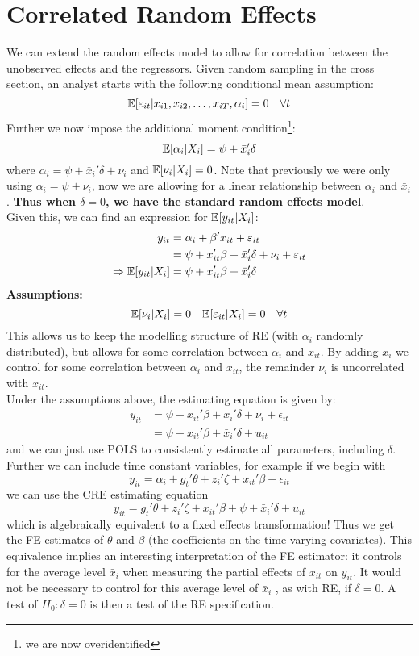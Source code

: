 \documentclass[DIV=14,titlepage=false]{scrreprt}
\begin{document}
\section{Correlated Random Effects}
We can extend the random effects model to allow for correlation between the unobserved effects and the regressors. Given random sampling in the cross section, an analyst starts with the following conditional mean assumption:
\[
    \mathbb{E}[\varepsilon_{it}|x_{i1}, x_{i2}, \dots, x_{iT}, \alpha_i] = 0 \quad \forall t
\]
Further we now impose the additional moment condition\footnote{we are now overidentified}:
\[
    \mathbb{E}[\alpha_i|X_i] = \psi + \bar x_i ' \delta
\]
where $\alpha_i = \psi + \bar x_i ' \delta + \nu_i$ and $\mathbb{E}[\nu_i|X_i] = 0$. Note that previously we were only using $\alpha_i = \psi + \nu_i$, now we are allowing for a linear relationship between $\alpha_i$ and $\bar x_i$. \textbf{Thus when $\delta = 0$, we have the standard random effects model}.\\
Given this, we can find an expression for $\mathbb{E}[y_{it}|X_i]$:
\begin{align*}
    y_{it} &= \alpha_i + \beta'x_{it} + \varepsilon_{it} \\
    &= \psi + x_{it}'\beta + \bar x_i'\delta + \nu_i + \varepsilon_{it} \\
    \Rightarrow \mathbb{E}[y_{it}|X_i] &= \psi + x_{it}'\beta + \bar x_i'\delta
\end{align*}
\textbf{Assumptions:}\\
\[ 
    \mathbb{E}[\nu_i|X_i] = 0 \quad \mathbb{E}[\varepsilon_{it}|X_i] = 0 \quad \forall t
\]
This allows us to keep the modelling structure of RE (with $\alpha_i$ randomly distributed), but allows for some correlation between $\alpha_i$ and $x_{it}$. By adding $\bar x_i$ we control for some correlation between $\alpha_i$ and $x_{it}$, the remainder $\nu_i$ is uncorrelated with $x_{it}$.\\
Under the assumptions above, the estimating equation is given by:
\begin{align*}
    y_{it} &= \psi + x_{it}'\beta + \bar x_i'\delta + \nu_i + \epsilon_{it}\\
    &= \psi + x_{it}'\beta + \bar x_i'\delta + u_{it}
\end{align*}
and we can just use POLS to consistently estimate all parameters, including $\delta$. Further we can include time constant variables, for example if we begin with 
\[
    y_{it} = \alpha_i + g_t'\theta + z_i' \zeta + x_{it}'\beta + \epsilon_{it}
\]
we can use the CRE estimating equation
\[
    y_{it} =  g_t'\theta + z_i' \zeta + x_{it}'\beta + \psi + \bar x_i'\delta + u_{it}
\]
which is algebraically equivalent to a fixed effects transformation! Thus we get the FE estimates of $\theta$ and $\beta$ (the coefficients on the time varying covariates). This equivalence implies an interesting interpretation of the FE estimator: it controls for the average level $\bar x_i$ when measuring the partial effects of $x_{it}$ on $y_{it}$. It would not be necessary to control for this average level of $\bar x_i$ , as with RE, if $\delta = 0$. A test of $H_0: \delta = 0$ is then a test of the RE specification.
\end{document}
